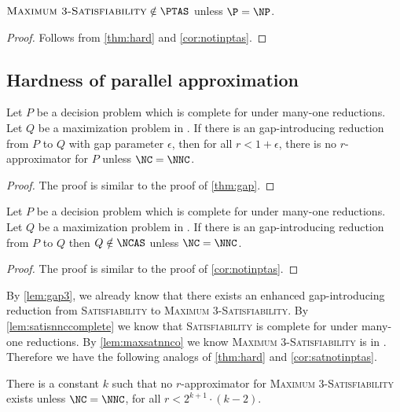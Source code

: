 \documentclass[]{article}
\begin{document}
\begin{corollary}\label{cor:satnotinptas}
  $\textsc{Maximum 3-Satisfiability} \notin \PTAS$ unless $\P = \NP$.
\end{corollary}
\begin{proof}
  Follows from \autoref{thm:hard} and \autoref{cor:notinptas}.
\end{proof}

\subsection{Hardness of parallel approximation}\label{ssc:nchardness}

\begin{theorem}\label{thm:ncgap}
  Let $P$ be a decision problem which is complete for \NNC{} under \NC{} many-one reductions.
  Let $Q$ be a maximization problem in \NNCO.
  If there is an \NC{} gap-introducing reduction from $P$ to $Q$ with gap parameter $\epsilon$, then for all $r < 1 + \epsilon$, there is no \FNC{} $r$-approximator for $P$ unless $\NC = \NNC$.
\end{theorem}
\begin{proof}
  The proof is similar to the proof of \autoref{thm:gap}.
\end{proof}

\begin{corollary}\label{cor:notinncas}
  Let $P$ be a decision problem which is complete for \NNC{} under \NC{} many-one reductions.
  Let $Q$ be a maximization problem in \NNCO.
  If there is an \NC{} gap-introducing reduction from $P$ to $Q$ then $Q \notin \NCAS$ unless $\NC = \NNC$.
\end{corollary}
\begin{proof}
  The proof is similar to the proof of \autoref{cor:notinptas}.
\end{proof}

By \autoref{lem:gap3}, we already know that there exists an \NC{} enhanced gap-introducing reduction from \textsc{Satisfiability} to \textsc{Maximum 3-Satisfiability}.
By \autoref{lem:satisnnccomplete} we know that \textsc{Satisfiability} is complete for \NNC{} under \NC{} many-one reductions.
By \autoref{lem:maxsatnnco} we know \textsc{Maximum 3-Satisfiability} is in \NNCO.
Therefore we have the following analogs of \autoref{thm:hard} and \autoref{cor:satnotinptas}.

\begin{theorem}\label{thm:nchard}
  There is a constant $k$ such that no \FNC{} $r$-approximator for \textsc{Maximum 3-Satisfiability} exists unless $\NC = \NNC$, for all $r < 2^{k + 1} \cdot (k - 2)$.
\end{theorem}
\end{document}
